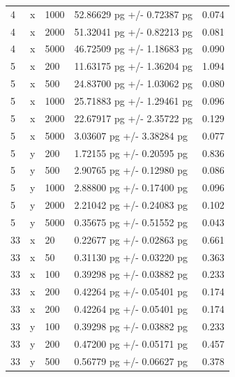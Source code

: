 \documentclass[12pt]{article}
\begin{document}
\begin{longtable}{lllll}
4         & x        & 1000 & 52.86629 pg +/- 0.72387 pg   & 0.074                  \\
4         & x        & 2000 & 51.32041 pg +/- 0.82213 pg   & 0.081                  \\
4         & x        & 5000 & 46.72509 pg +/- 1.18683 pg   & 0.090                  \\
5         & x        & 200  & 11.63175 pg +/- 1.36204 pg   & 1.094                  \\
5         & x        & 500  & 24.83700 pg +/- 1.03062 pg   & 0.080                  \\
5         & x        & 1000 & 25.71883 pg +/- 1.29461 pg   & 0.096                  \\
5         & x        & 2000 & 22.67917 pg +/- 2.35722 pg   & 0.129                  \\
5         & x        & 5000 & 3.03607 pg +/- 3.38284 pg    & 0.077                  \\
5         & y        & 200  & 1.72155 pg +/- 0.20595 pg    & 0.836                  \\
5         & y        & 500  & 2.90765 pg +/- 0.12980 pg    & 0.086                  \\
5         & y        & 1000 & 2.88800 pg +/- 0.17400 pg    & 0.096                  \\
5         & y        & 2000 & 2.21042 pg +/- 0.24083 pg    & 0.102                  \\
5         & y        & 5000 & 0.35675 pg +/- 0.51552 pg    & 0.043                  \\
33        & x        & 20   & 0.22677 pg +/- 0.02863 pg    & 0.661                  \\
33        & x        & 50   & 0.31130 pg +/- 0.03220 pg    & 0.363                  \\
33        & x        & 100  & 0.39298 pg +/- 0.03882 pg    & 0.233                  \\
33        & x        & 200  & 0.42264 pg +/- 0.05401 pg    & 0.174                  \\
33        & x        & 200  & 0.42264 pg +/- 0.05401 pg    & 0.174                  \\
33        & y        & 100  & 0.39298 pg +/- 0.03882 pg    & 0.233                  \\
33        & y        & 200  & 0.47200 pg +/- 0.05171 pg    & 0.457                  \\
33        & y        & 500  & 0.56779 pg +/- 0.06627 pg    & 0.378                  \\

\end{longtable}
\end{document}
